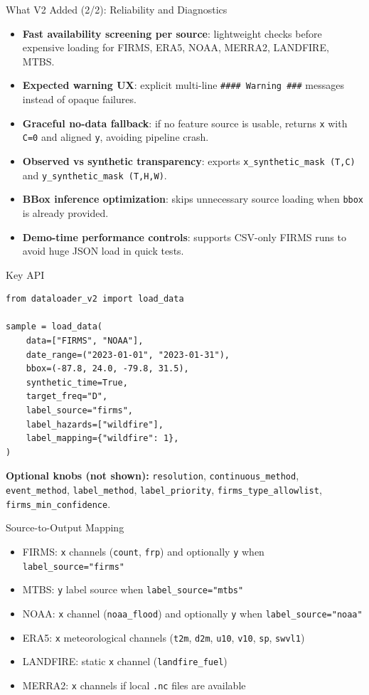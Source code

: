 \documentclass{beamer}
\begin{document}
\begin{frame}{What V2 Added (2/2): Reliability and Diagnostics}
\begin{itemize}
  \item \textbf{Fast availability screening per source}: lightweight checks before expensive loading for FIRMS, ERA5, NOAA, MERRA2, LANDFIRE, MTBS.
  \item \textbf{Expected warning UX}: explicit multi-line \texttt{#### Warning ###} messages instead of opaque failures.
  \item \textbf{Graceful no-data fallback}: if no feature source is usable, returns \texttt{x} with \texttt{C=0} and aligned \texttt{y}, avoiding pipeline crash.
  \item \textbf{Observed vs synthetic transparency}: exports \texttt{x\_synthetic\_mask (T,C)} and \texttt{y\_synthetic\_mask (T,H,W)}.
  \item \textbf{BBox inference optimization}: skips unnecessary source loading when \texttt{bbox} is already provided.
  \item \textbf{Demo-time performance controls}: supports CSV-only FIRMS runs to avoid huge JSON load in quick tests.
\end{itemize}
\end{frame}

\begin{frame}[fragile]{Key API}
\begin{lstlisting}[style=pycode]
from dataloader_v2 import load_data

sample = load_data(
    data=["FIRMS", "NOAA"],
    date_range=("2023-01-01", "2023-01-31"),
    bbox=(-87.8, 24.0, -79.8, 31.5),
    synthetic_time=True,
    target_freq="D",
    label_source="firms",
    label_hazards=["wildfire"],
    label_mapping={"wildfire": 1},
)
\end{lstlisting}
\vspace{0.3em}
\textbf{Optional knobs (not shown):} \texttt{resolution}, \texttt{continuous\_method},
\texttt{event\_method}, \texttt{label\_method}, \texttt{label\_priority},
\texttt{firms\_type\_allowlist}, \texttt{firms\_min\_confidence}.
\end{frame}

\begin{frame}{Source-to-Output Mapping}
\begin{itemize}
  \item FIRMS: \texttt{x} channels (\texttt{count}, \texttt{frp}) and optionally \texttt{y} when \texttt{label\_source="firms"}
  \item MTBS: \texttt{y} label source when \texttt{label\_source="mtbs"}
  \item NOAA: \texttt{x} channel (\texttt{noaa\_flood}) and optionally \texttt{y} when \texttt{label\_source="noaa"}
  \item ERA5: \texttt{x} meteorological channels (\texttt{t2m}, \texttt{d2m}, \texttt{u10}, \texttt{v10}, \texttt{sp}, \texttt{swvl1})
  \item LANDFIRE: static \texttt{x} channel (\texttt{landfire\_fuel})
  \item MERRA2: \texttt{x} channels if local \texttt{.nc} files are available
\end{itemize}
\end{frame}
\end{document}
